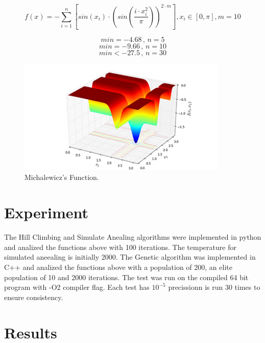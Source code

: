 \documentclass{report}
\begin{document}
\pagebreak

\begin{figure}[!h]
  \centering
  $$ f(x) = -\sum_{i=1}^n \left[sin(x_i) \cdot \left( sin\left( \frac{i \cdot x_i^2}{\pi}  \right) \right)^{2 \cdot m} \right] ,
  x_i \in \left[ 0, \pi \right] ,  m = 10$$

   $$min = -4.68 \, , \, n = 5$$
   $$min = -9.66 \, , \, n = 10$$
   $$min < -27.5 \, , \, n = 30$$

  \includegraphics[width=100mm,scale=0.5]{Michalewicz_functions}
  \caption{Michalewicz's Function. \protect\footnotemark}
\end{figure}

\pagebreak

\section*{Experiment}

The Hill Climbing and Simulate Anealing algorithms were implemented in python and analized the functions above with 100 iterations. The temperature for simulated aneealing is initially 2000.
\newline
The Genetic algorithm was implemented in C++ and analized the functions above with a population of 200, an elite population of 10 and 2000 iterations. The test was run on the compiled 64 bit program with -O2 compiler flag.
\newline
Each test has $10^{-5}$ precissionn is run 30 times to ensure consistency.

\section*{Results}
\end{document}
